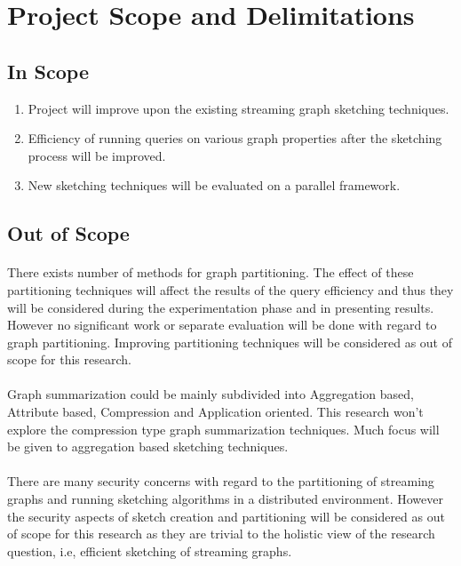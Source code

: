 \section{Project Scope and Delimitations}

\subsection{In Scope}
\begin{enumerate}
    \item Project will improve upon the existing streaming graph sketching techniques. 
    \item Efficiency of running queries on various graph properties after the sketching process will be improved.
    \item New sketching techniques will be evaluated on a parallel framework.
\end{enumerate}

\subsection{Out of Scope}

\paragraph{}
There exists number of methods for graph partitioning. The effect of these 
partitioning techniques will affect the results of the query efficiency and 
thus they will be considered during the experimentation phase and in presenting 
results. However no significant work or separate evaluation will be done with 
regard to graph partitioning. Improving partitioning techniques will be 
considered as out of scope for this research. 

\paragraph{}
Graph summarization could be mainly subdivided into Aggregation based, 
Attribute based, Compression and Application oriented. This research won’t 
explore the compression type graph summarization techniques. Much focus will 
be given to aggregation based sketching techniques. 

\paragraph{}
There are many security concerns with regard to the partitioning of streaming 
graphs and running sketching algorithms in a distributed environment. However 
the security aspects of sketch creation and partitioning will be considered 
as out of scope for this research as they are trivial to the holistic view 
of the research question, i.e, efficient sketching of streaming graphs. 

